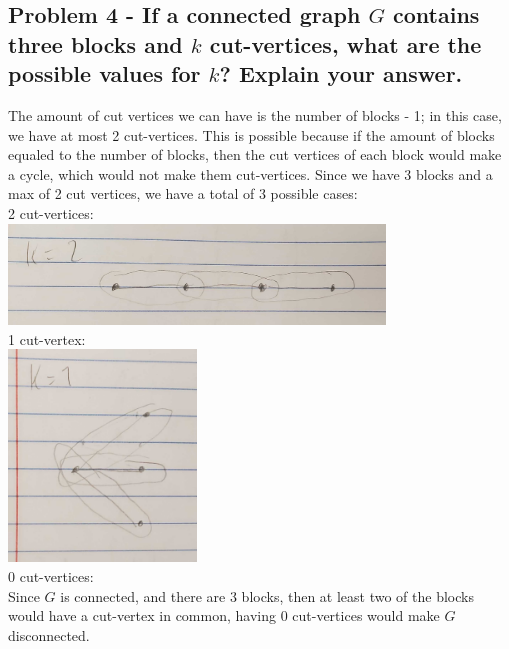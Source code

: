 \documentclass[10pt,a4paper]{article}
\begin{document}
\subsection*{\newpage Problem 4 - If a connected graph $G$ contains three blocks and $k$ cut-vertices, what are the possible values for $k$? Explain your answer.}
The amount of cut vertices we can have is the number of blocks - 1; in this case, we have at most 2 cut-vertices.
This is possible because if the amount of blocks equaled to the number of blocks, then the cut vertices of each block would make a cycle, which would not make them cut-vertices.
Since we have 3 blocks and a max of 2 cut vertices, we have a total of 3 possible cases:\\
2 cut-vertices:\\\includegraphics[width = 10cm]{k=2}\\
1 cut-vertex:\\\includegraphics[width = 5cm]{k=1}\\
0 cut-vertices:\\Since $G$ is connected, and there are 3 blocks, then at least two of the blocks would have a cut-vertex in common, having 0 cut-vertices would make $G$ disconnected. \\
\end{document}
